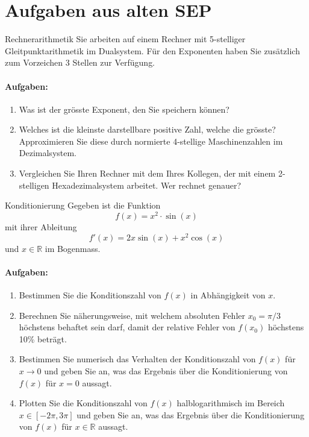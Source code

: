 \section{Aufgaben aus alten SEP}

\begin{example2}{Rechnerarithmetik}
Sie arbeiten auf einem Rechner mit 5-stelliger Gleitpunktarithmetik im Dualsystem. Für den Exponenten haben Sie zusätzlich zum Vorzeichen 3 Stellen zur Verfügung.

\paragraph{Aufgaben:}
\begin{enumerate}
    \item Was ist der grösste Exponent, den Sie speichern können?
    \item Welches ist die kleinste darstellbare positive Zahl, welche die grösste? Approximieren Sie diese durch normierte 4-stellige Maschinenzahlen im Dezimalsystem.
    \item Vergleichen Sie Ihren Rechner mit dem Ihres Kollegen, der mit einem 2-stelligen Hexadezimalsystem arbeitet. Wer rechnet genauer?
\end{enumerate}
\end{example2}

\begin{example2}{Konditionierung}
Gegeben ist die Funktion
$$f(x) = x^2 \cdot \sin(x)$$
mit ihrer Ableitung
$$f'(x) = 2x\sin(x) + x^2\cos(x)$$
und $x \in \mathbb{R}$ im Bogenmass.

\paragraph{Aufgaben:}
\begin{enumerate}
    \item Bestimmen Sie die Konditionszahl von $f(x)$ in Abhängigkeit von $x$.
    \item Berechnen Sie näherungsweise, mit welchem absoluten Fehler $x_0 = \pi/3$ höchstens behaftet sein darf, damit der relative Fehler von $f(x_0)$ höchstens 10\% beträgt.
    \item Bestimmen Sie numerisch das Verhalten der Konditionszahl von $f(x)$ für $x \to 0$ und geben Sie an, was das Ergebnis über die Konditionierung von $f(x)$ für $x = 0$ aussagt.
    \item Plotten Sie die Konditionszahl von $f(x)$ halblogarithmisch im Bereich $x \in [-2\pi, 3\pi]$ und geben Sie an, was das Ergebnis über die Konditionierung von $f(x)$ für $x \in \mathbb{R}$ aussagt.
\end{enumerate}
\end{example2}

